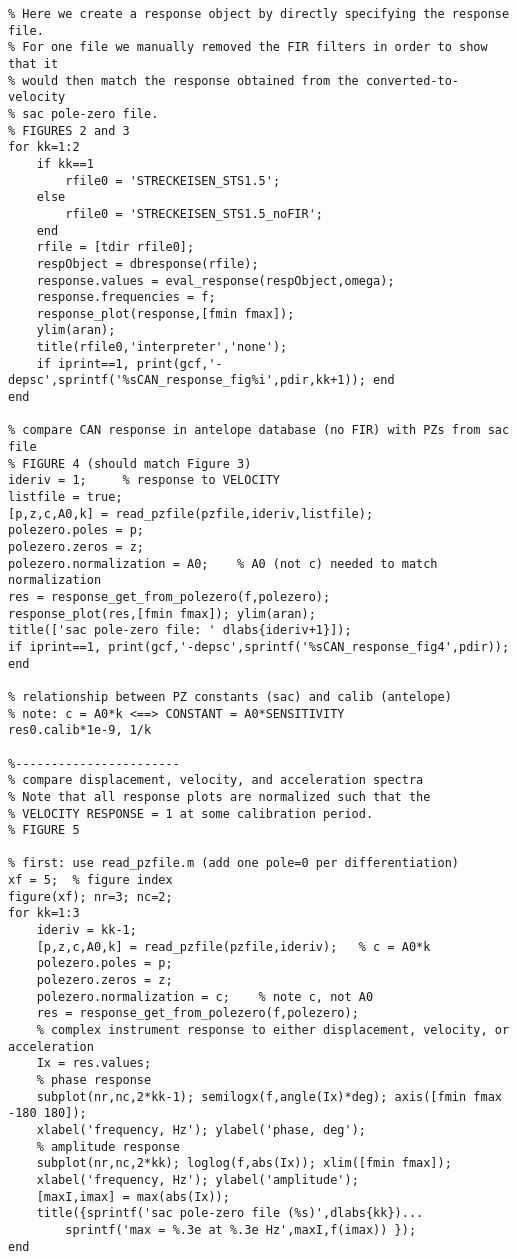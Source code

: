 \documentclass[11pt,titlepage,fleqn]{article}
\begin{document}
\begin{spacing}{1.0}
\begin{verbatim}
% Here we create a response object by directly specifying the response file.
% For one file we manually removed the FIR filters in order to show that it
% would then match the response obtained from the converted-to-velocity
% sac pole-zero file.
% FIGURES 2 and 3
for kk=1:2
    if kk==1
        rfile0 = 'STRECKEISEN_STS1.5';
    else
        rfile0 = 'STRECKEISEN_STS1.5_noFIR';
    end
    rfile = [tdir rfile0];
    respObject = dbresponse(rfile);
    response.values = eval_response(respObject,omega);
    response.frequencies = f;
    response_plot(response,[fmin fmax]);
    ylim(aran);
    title(rfile0,'interpreter','none');
    if iprint==1, print(gcf,'-depsc',sprintf('%sCAN_response_fig%i',pdir,kk+1)); end
end

% compare CAN response in antelope database (no FIR) with PZs from sac file
% FIGURE 4 (should match Figure 3)
ideriv = 1;     % response to VELOCITY
listfile = true;
[p,z,c,A0,k] = read_pzfile(pzfile,ideriv,listfile);
polezero.poles = p;
polezero.zeros = z;
polezero.normalization = A0;    % A0 (not c) needed to match normalization
res = response_get_from_polezero(f,polezero);
response_plot(res,[fmin fmax]); ylim(aran);
title(['sac pole-zero file: ' dlabs{ideriv+1}]);
if iprint==1, print(gcf,'-depsc',sprintf('%sCAN_response_fig4',pdir)); end

% relationship between PZ constants (sac) and calib (antelope)
% note: c = A0*k <==> CONSTANT = A0*SENSITIVITY
res0.calib*1e-9, 1/k

%-----------------------
% compare displacement, velocity, and acceleration spectra
% Note that all response plots are normalized such that the
% VELOCITY RESPONSE = 1 at some calibration period.
% FIGURE 5

% first: use read_pzfile.m (add one pole=0 per differentiation)
xf = 5;  % figure index
figure(xf); nr=3; nc=2;
for kk=1:3
    ideriv = kk-1;
    [p,z,c,A0,k] = read_pzfile(pzfile,ideriv);   % c = A0*k
    polezero.poles = p;
    polezero.zeros = z;
    polezero.normalization = c;    % note c, not A0
    res = response_get_from_polezero(f,polezero);
    % complex instrument response to either displacement, velocity, or acceleration
    Ix = res.values;
    % phase response
    subplot(nr,nc,2*kk-1); semilogx(f,angle(Ix)*deg); axis([fmin fmax -180 180]);
    xlabel('frequency, Hz'); ylabel('phase, deg');
    % amplitude response
    subplot(nr,nc,2*kk); loglog(f,abs(Ix)); xlim([fmin fmax]);
    xlabel('frequency, Hz'); ylabel('amplitude');
    [maxI,imax] = max(abs(Ix));
    title({sprintf('sac pole-zero file (%s)',dlabs{kk})...
        sprintf('max = %.3e at %.3e Hz',maxI,f(imax)) });
end


\end{verbatim}
\end{spacing}
\end{document}
